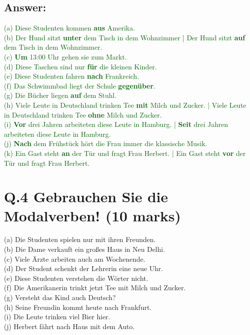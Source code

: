\documentclass[a4paper,12pt]{article}
\begin{document}
\subsection*{Answer:}
\textcolor{darkgreen}{(a) Diese Studenten kommen \textbf{aus} Amerika.}\\
\textcolor{darkgreen}{(b) Der Hund sitzt \textbf{unter} dem Tisch in dem Wohnzimmer | Der Hund sitzt \textbf{auf} dem Tisch in dem Wohnzimmer.}\\
\textcolor{darkgreen}{(c) \textbf{Um} 13:00 Uhr gehen sie zum Markt.}\\
\textcolor{darkgreen}{(d) Diese Taschen sind nur \textbf{für} die kleinen Kinder.}\\
\textcolor{darkgreen}{(e) Diese Studenten fahren \textbf{nach} Frankreich.}\\
\textcolor{darkgreen}{(f) Das Schwimmbad liegt der Schule \textbf{gegenüber}.}\\
\textcolor{darkgreen}{(g) Die Bücher liegen \textbf{auf} dem Stuhl.}\\
\textcolor{darkgreen}{(h) Viele Leute in Deutschland trinken Tee \textbf{mit} Milch und Zucker. | Viele Leute in Deutschland trinken Tee \textbf{ohne} Milch und Zucker.}\\
\textcolor{darkgreen}{(i) \textbf{Vor} drei Jahren arbeiteten diese Leute in Hamburg. | \textbf{Seit} drei Jahren arbeiteten diese Leute in Hamburg.}\\
\textcolor{darkgreen}{(j) \textbf{Nach} dem Frühstück hört die Frau immer die klassische Musik.}\\
\textcolor{darkgreen}{(k) Ein Gast steht \textbf{an} der Tür und fragt Frau Herbert. | Ein Gast steht \textbf{vor} der Tür und fragt Frau Herbert.}


\vspace{1cm}

\section*{Q.4 Gebrauchen Sie die Modalverben! (10 marks)}

(a) Die Studenten spielen nur mit ihren Freunden.\\
(b) Die Dame verkauft ein großes Haus in Neu Delhi.\\
(c) Viele Ärzte arbeiten auch am Wochenende.\\
(d) Der Student schenkt der Lehrerin eine neue Uhr.\\
(e) Diese Studenten verstehen die Wörter nicht.\\
(f) Die Amerikanerin trinkt jetzt Tee mit Milch und Zucker.\\
(g) Versteht das Kind auch Deutsch?\\
(h) Seine Freundin kommt heute nach Frankfurt.\\
(i) Die Leute trinken viel Bier hier.\\
(j) Herbert fährt nach Haus mit dem Auto.
\end{document}
